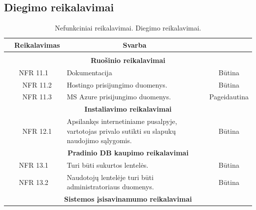 \documentclass{VUMIFPSkursinis}
\begin{document}
\subsection{Diegimo reikalavimai}
\begin{table}[H]
	\caption{Nefunkciniai reikalavimai. Diegimo reikalavimai.}
	\begin{tabular}{|p{1cm}|p{1cm}|p{}|p{}|}
	\hline 
\rowcolor{gray!50}
		\multicolumn{2}{|c|}{{\bfseries Kodas}}&
		\multicolumn{1}{c|}{{\bfseries Reikalavimas}}&
		\multicolumn{1}{c|}{{\bfseries Svarba}}\\
\hline
\rowcolor{lightgray}
\multicolumn{4}{|c|}{Diegimo reikalavimai}\\		

\hline
\multicolumn{4}{|c|}{\bfseries Ruošinio reikalavimai}\\	

\hline
	\multicolumn{2}{|c|}{NFR 11.1}&
	{Dokumentacija
}&		
	\multicolumn{1}{c|}{Būtina}\\
\hline
	\multicolumn{1}{|c}{}&
	\multicolumn{1}{c|}{NFR 11.2}&
	{Hostingo prisijungimo duomenys.
}&		
	\multicolumn{1}{c|}{Būtina}\\

\hline
	\multicolumn{1}{|c}{}&
	\multicolumn{1}{c|}{NFR 11.3}&
	{MS Azure prisijungimo duomenys.
}&		
	\multicolumn{1}{c|}{Pageidautina}\\
	
	
	\hline
\multicolumn{4}{|c|}{\bfseries Instaliavimo reikalavimai}\\		
				
	\hline
		\multicolumn{1}{|c}{}&
		\multicolumn{1}{c|}{NFR 12.1}&
		{Apsilankęs internetiniame pusalpyje, vartotojas privalo sutikti su slapukų naudojimo sąlygomis.
		}&
		\multicolumn{1}{c|}{Būtina}\\	
				
\hline
\multicolumn{4}{|c|}{\bfseries Pradinio DB kaupimo reikalavimai}\\		
		
	\hline
		\multicolumn{2}{|c|}{NFR 13.1}&
		{Turi būti sukurtos lentelės.}&
		\multicolumn{1}{c|}{Būtina}\\
		
	\hline
		\multicolumn{2}{|c|}{NFR 13.2}&
		{Naudotojų lentelėje turi būti administratoriaus duomenys.}&
		\multicolumn{1}{c|}{Būtina}\\	
		
	\hline
\multicolumn{4}{|c|}{\bfseries Sistemos įsisavinamumo reikalavimai}\\		
			

\end{tabular}
\end{table}
\end{document}
